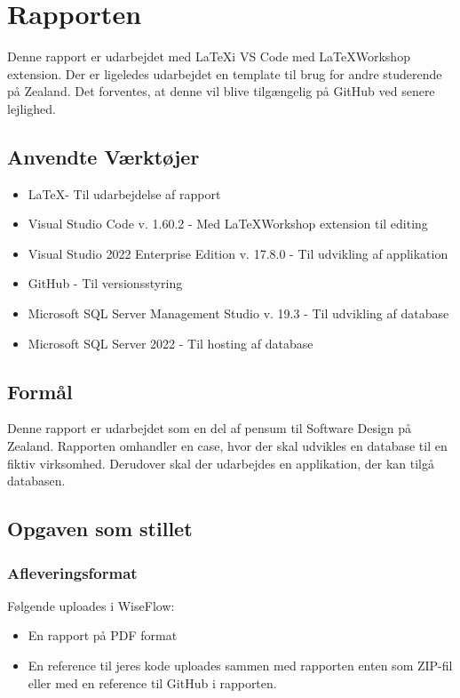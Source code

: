 \chapter{Rapporten}
Denne rapport er udarbejdet med \LaTeX  i VS Code med \LaTeX  Workshop extension. 
Der er ligeledes udarbejdet en template til brug for andre studerende på Zealand. Det forventes, at denne vil blive tilgængelig på GitHub ved senere lejlighed.

\section{Anvendte Værktøjer}
\begin{itemize}
    \item \LaTeX  - Til udarbejdelse af rapport
    \item Visual Studio Code v. 1.60.2 - Med \LaTeX  Workshop extension til editing
    \item Visual Studio 2022 Enterprise Edition v. 17.8.0 - Til udvikling af applikation
    \item GitHub - Til versionsstyring
    \item Microsoft SQL Server Management Studio v. 19.3 - Til udvikling af database
    \item Microsoft SQL Server 2022 - Til hosting af database
\end{itemize}

\section{Formål}
Denne rapport er udarbejdet som en del af pensum til Software Design på Zealand. Rapporten omhandler en case, hvor der skal udvikles en database til en fiktiv virksomhed. 
Derudover skal der udarbejdes en applikation, der kan tilgå databasen.

\section{Opgaven som stillet}
\subsection{Afleveringsformat}
Følgende uploades i WiseFlow:
\begin{itemize}
    \item En rapport på PDF format
    \item En reference til jeres kode uploades sammen med rapporten enten som ZIP-fil eller med en reference til GitHub i rapporten.
\end{itemize}

